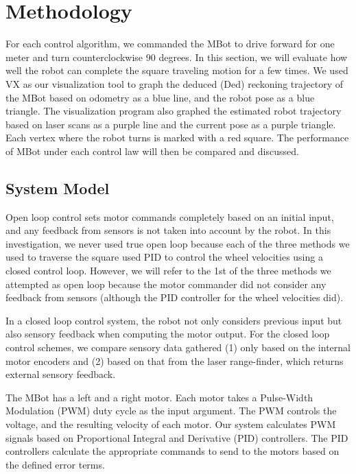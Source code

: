 \documentclass[conference]{IEEEtran}
\begin{document}
\section{Methodology}
For each control algorithm, we commanded the MBot to drive forward for one meter and turn counterclockwise 90 degrees. In this section, we will evaluate how well the robot can complete the square traveling motion for a few times. We used VX as our visualization tool to graph the deduced (Ded) reckoning trajectory of the MBot based on odometry as a blue line, and the robot pose as a blue triangle. The visualization program also graphed the estimated robot trajectory based on laser scans as a purple line and the current pose as a purple triangle. Each vertex where the robot turns is marked with a red square. The performance of MBot under each control law will then be compared and discussed.


\subsection{System Model}
Open loop control sets motor commands completely based on an initial input, and any feedback from sensors is not taken into account by the robot.  In this investigation, we never used true open loop because each of the three methods we used to traverse the square used PID to control the wheel velocities using a closed control loop.  However, we will refer to the 1st of the three methods we attempted as open loop because the motor commander did not consider any feedback from sensors (although the PID controller for the wheel velocities did).

In a closed loop control system, the robot not only considers previous input but also sensory feedback when computing the motor output. For the closed loop control schemes, we compare sensory data gathered (1) only based on the internal motor encoders and (2) based on that from the laser range-finder, which returns external sensory feedback.

The MBot has a left and a right motor. Each motor takes a Pulse-Width Modulation (PWM) duty cycle as the input argument. The PWM controls the voltage, and the resulting velocity of each motor. Our system calculates PWM signals based on Proportional Integral and Derivative (PID) controllers. The PID controllers calculate the appropriate commands to send to the motors based on the defined error terms. 
\end{document}
